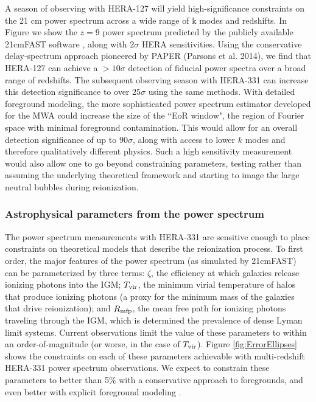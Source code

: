 \documentclass[preprint]{aastex}
\begin{document}
A season of observing with HERA-127 will yield high-significance constraints on the 21 cm power spectrum across a wide range of k modes and redshifts.  In Figure we show the $z=9$ power spectrum predicted by the publicly available 21cmFAST software \citep{mesinger_et_al2011}, along with $2\sigma$ HERA sensitivities.  Using the conservative delay-spectrum approach pioneered by PAPER (Parsons et al. 2014), we find that HERA-127 can achieve a $> 10\sigma$ detection of fiducial power spectra over a broad range of redshifts.  The subsequent observing season with HERA-331 can increase this detection significance to over $25\sigma$ using the same methods.  With detailed foreground modeling, the more sophisticated power spectrum estimator developed for the MWA could increase the size of the ``EoR window", the region of Fourier space with minimal foreground contamination. This would allow for an overall detection significance of up to $90\sigma$, along with access to lower $k$ modes and therefore qualitatively different physics.  Such a high 
sensitivity measurement would also allow one to go beyond constraining parameters, testing rather than assuming the underlying theoretical framework and starting to image the large neutral bubbles during reionization.

\subsubsection{Astrophysical parameters from the power spectrum}
The power spectrum measurements with HERA-331 are sensitive enough to place constraints on theoretical models that describe the reionization process.  To first order, the major features of the power spectrum (as simulated by 21cmFAST) can be parameterized by three terms: $\zeta$, the efficiency at which galaxies release ionizing photons into the IGM; $T_{\rm vir}$, the minimum virial temperature of halos that produce ionizing photons (a proxy for the minimum mass of the galaxies that drive reionization); and $R_{\rm mfp}$, the mean free path for ionizing photons traveling through the IGM, which is determined the prevalence of dense Lyman limit systems.  Current observations limit the value of these parameters to within an order-of-magnitude (or worse, in the case of $T_{\rm vir}$).  Figure \ref{fig:ErrorEllipses} shows the constraints on each of these parameters achievable with multi-redshift HERA-331 power spectrum observations.  We expect to constrain these parameters to better than 5\% with a conservative 
approach to foregrounds, and even better with explicit foreground modeling \citep{pober_et_al2014}.
\end{document}
